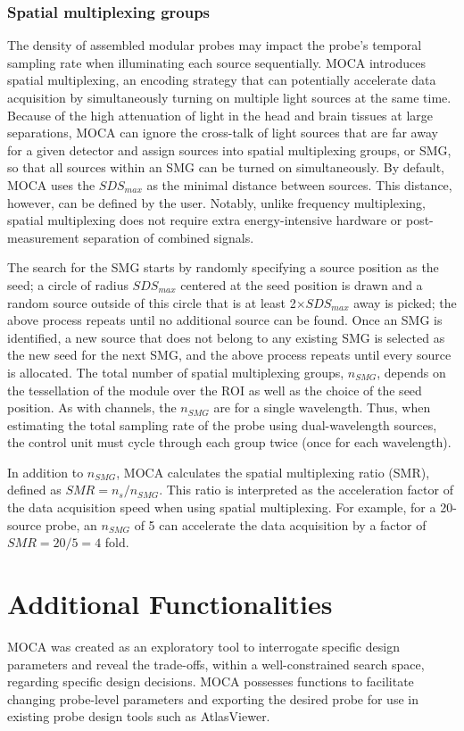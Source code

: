 \subsubsection{Spatial multiplexing groups}
The density of assembled modular probes may impact the probe's temporal sampling rate when illuminating each source sequentially. MOCA introduces spatial multiplexing, an encoding strategy that can potentially accelerate data acquisition by simultaneously turning on multiple light sources at the same time. Because of the high attenuation of light in the head and brain tissues at large separations, MOCA can ignore the cross-talk of light sources that are far away for a given detector and assign sources into spatial multiplexing groups, or SMG, so that all sources within an SMG can be turned on simultaneously. By default, MOCA uses the $SDS_{max}$ as the minimal distance between sources. This distance, however, can be defined by the user. Notably, unlike frequency multiplexing, spatial multiplexing does not require extra energy-intensive hardware or post-measurement separation of combined signals. 

The search for the SMG starts by randomly specifying a source position as the seed; a circle of radius $SDS_{max}$ centered at the seed position is drawn and a random source outside of this circle that is at least 2$\times SDS_{max}$ away is picked; the above process repeats until no additional source can be found. Once an SMG is identified, a new source that does not belong to any existing SMG is selected as the new seed for the next SMG, and the above process repeats until every source is allocated. The total number of spatial multiplexing groups, $n_{SMG}$, depends on the tessellation of the module over the ROI as well as the choice of the seed position. As with channels, the $n_{SMG}$ are for a single wavelength. Thus, when estimating the total sampling rate of the probe using dual-wavelength sources, the control unit must cycle through each group twice (once for each wavelength).

In addition to $n_{SMG}$, MOCA calculates the spatial multiplexing ratio (SMR), defined as $SMR=n_s/n_{SMG}$. This ratio is interpreted as the acceleration factor of the data acquisition speed when using spatial multiplexing. For example, for a 20-source probe, an $n_{SMG}$ of 5 can accelerate the data acquisition by a factor of $SMR=20/5=4$ fold.



\section{Additional Functionalities}
\label{sec:features}
MOCA was created as an exploratory tool to interrogate specific design parameters and reveal the trade-offs, within a well-constrained search space, regarding specific design decisions. MOCA possesses functions to facilitate changing probe-level parameters and exporting the desired probe for use in existing probe design tools such as AtlasViewer.


